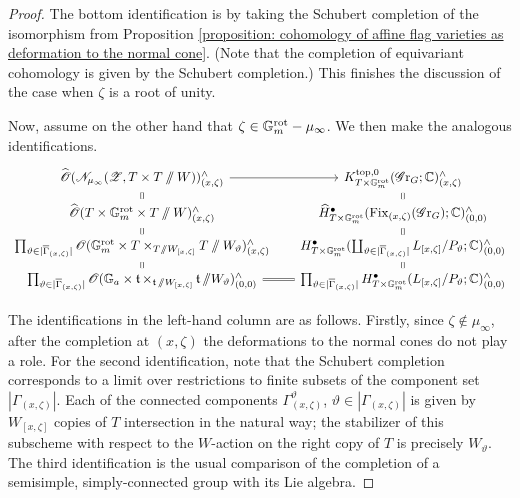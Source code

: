 \begin{proof}
The bottom identification is by taking the Schubert completion of the isomorphism from Proposition \ref{proposition: cohomology of affine flag varieties as deformation to the normal cone}. (Note that the completion of equivariant cohomology is given by the Schubert completion.) This finishes the discussion of the case when $\zeta$ is a root of unity.

\bigskip
Now, assume on the other hand that $\zeta \in \mathbb{G}_m^{\mathrm{rot}} - \mu_{\infty}$. We then make the analogous identifications.
\begin{equation*}
    \begin{tikzcd}[row sep = 5, column sep =15]
      \widehat{\O}({\eN}_{\mu_{\infty}}(\eZ, T \times T \sslash W))^{\wedge}_{(x, \zeta)} \arrow[d, equal] \arrow[r] & K^{\top, 0}_{T \times \Gm^{\rot}}(\Gr_{G}; \C)^{\wedge}_{(x, \zeta)} \arrow[d, equal] \\
      \widehat{\O}(T \times \Gm^{\rot} \times T \sslash W)^{\wedge}_{(x, \zeta)} \arrow[d, equal]  & \widehat{H}^{\bullet}_{T \times \Gm^{\rot}}(\Fix_{(x, \zeta)}(\Gr_G); \C)^{\wedge}_{(0, 0)} \arrow[d, equal] \\
      \prod_{\vartheta \in |\overline{\Gamma}_{(x, \zeta)}|} {\O}(\Gm^{\rot} \times T \times_{T \sslash W_{[x, \zeta]}} T \sslash W_{\vartheta} )^{\wedge}_{(x, \zeta)} \arrow[d, equal] & {H}^{\bullet}_{T \times \Gm^{\rot}}(\coprod_{\vartheta \in |\overline{\Gamma}_{(x, \zeta)}|} L_{[x, \zeta]}/P_{\vartheta}; \C)^{\wedge}_{(0, 0)} \arrow[d, equal] \\
      \prod_{\vartheta \in |\overline{\Gamma}_{(x, \zeta)}|} {\O}(\Ga \times\t \times_{\t \sslash W_{[x, \zeta]}} \t \sslash W_{\vartheta})^{\wedge}_{(0,0)} \arrow[r, equal] & \prod_{\vartheta \in |\overline{\Gamma}_{(x, \zeta)}|} {H}^{\bullet}_{T \times \Gm^{\rot}}(L_{[x, \zeta]}/P_{\vartheta}; \C)^{\wedge}_{(0, 0)}
    \end{tikzcd}
\end{equation*}

The identifications in the left-hand column are as follows. Firstly, since $\zeta \notin \mu_{\infty}$, after the completion at $(x, \zeta)$ the deformations to the normal cones do not play a role. For the second identification, note that the Schubert completion corresponds to a limit over restrictions to finite subsets of the component set $|\Gamma_{(x, \zeta)}|$. Each of the connected components $\Gamma^{\vartheta}_{(x, \zeta)}$, $\vartheta \in |\Gamma_{(x, \zeta)}|$ is given by $W_{[x, \zeta]}$ copies of $T$ intersection in the natural way; the stabilizer of this subscheme with respect to the $W$-action on the right copy of $T$ is precisely $W_{\vartheta}$. The third identification is the usual comparison of the completion of a semisimple, simply-connected group with its Lie algebra.


\end{proof}
